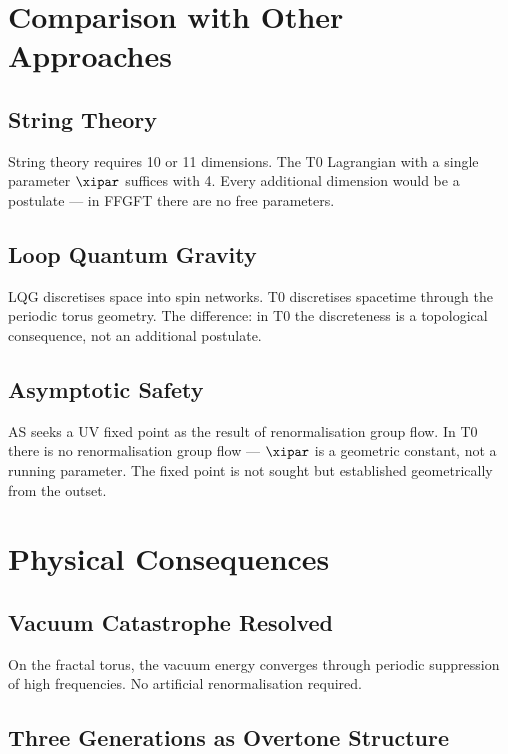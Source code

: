 \section{Comparison with Other Approaches}

\subsection{String Theory}

String theory requires 10 or 11 dimensions. The T0 Lagrangian with a single parameter $\xipar$ suffices with 4. Every additional dimension would be a postulate — in FFGFT there are no free parameters.

\subsection{Loop Quantum Gravity}

LQG discretises space into spin networks. T0 discretises spacetime through the periodic torus geometry. The difference: in T0 the discreteness is a topological consequence, not an additional postulate.

\subsection{Asymptotic Safety}

AS seeks a UV fixed point as the result of renormalisation group flow. In T0 there is no renormalisation group flow — $\xipar$ is a geometric constant, not a running parameter. The fixed point is not sought but established geometrically from the outset.

\section{Physical Consequences}

\subsection{Vacuum Catastrophe Resolved}

On the fractal torus, the vacuum energy converges through periodic suppression of high frequencies. No artificial renormalisation required.

\subsection{Three Generations as Overtone Structure}

